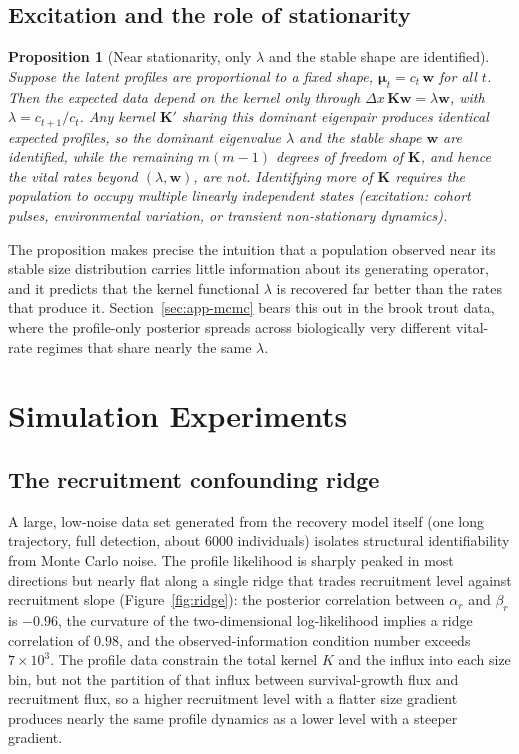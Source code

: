 \documentclass[11pt]{article}
\newtheorem{proposition}{Proposition}
\begin{document}
\subsection{Excitation and the role of stationarity}
\begin{proposition}[Near stationarity, only $\lambda$ and the stable shape are
identified]
\label{prop:excite}
Suppose the latent profiles are proportional to a fixed shape,
$\boldsymbol{\mu}_t=c_t\,\mathbf{w}$ for all $t$. Then the expected data depend on
the kernel only through $\Delta x\,\mathbf{K}\mathbf{w}=\lambda\mathbf{w}$, with
$\lambda=c_{t+1}/c_t$. Any kernel $\mathbf{K}'$ sharing this dominant eigenpair
produces identical expected profiles, so the dominant eigenvalue $\lambda$ and the
stable shape $\mathbf{w}$ are identified, while the remaining $m(m-1)$ degrees of
freedom of $\mathbf{K}$, and hence the vital rates beyond $(\lambda,\mathbf{w})$,
are not. Identifying more of $\mathbf{K}$ requires the population to occupy
multiple linearly independent states (excitation: cohort pulses, environmental
variation, or transient non-stationary dynamics).
\end{proposition}
\noindent The proposition makes precise the intuition that a population observed
near its stable size distribution carries little information about its generating
operator, and it predicts that the kernel functional $\lambda$ is recovered far
better than the rates that produce it. Section~\ref{sec:app-mcmc} bears this out
in the brook trout data, where the profile-only posterior spreads across
biologically very different vital-rate regimes that share nearly the same
$\lambda$.

\section{Simulation Experiments}
\label{sec:sim}

\subsection{The recruitment confounding ridge}
\label{sec:sim-confound}
A large, low-noise data set generated from the recovery model itself
(one long trajectory, full detection, about 6000 individuals) isolates structural
identifiability from Monte Carlo noise. The profile likelihood is sharply peaked
in most directions but nearly flat along a single ridge that trades recruitment
level against recruitment slope (Figure~\ref{fig:ridge}): the posterior
correlation between $\alpha_r$ and $\beta_r$ is $-0.96$, the curvature of the
two-dimensional log-likelihood implies a ridge correlation of $0.98$, and the
observed-information condition number exceeds $7\times10^3$. The profile data
constrain the total kernel $K$ and the influx into each size bin, but not the
partition of that influx between survival-growth flux and recruitment flux, so a
higher recruitment level with a flatter size gradient produces nearly the same
profile dynamics as a lower level with a steeper gradient.
\end{document}
